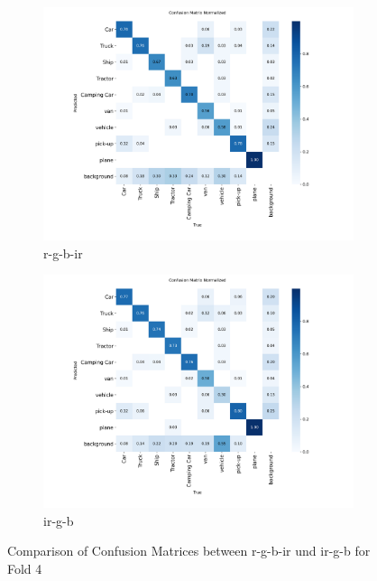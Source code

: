 \begin{figure}[h] 
    \centering
    \begin{subfigure}[b]{0.85\textwidth} %
        \includegraphics[width=\textwidth]{images/confusion_matrices/rgbir_F4_confusion_matrix_normalized.png} %
        \caption{r-g-b-ir} %
        \label{fig:cm_trgbir} %
    \end{subfigure}
    \hfill %
    \begin{subfigure}[b]{0.85\textwidth} %
        \includegraphics[width=\textwidth]{images/confusion_matrices/irgb_F4_confusion_matrix_normalized.png} %
        \caption{ir-g-b} %
        \label{fig:cm_irgb} %
    \end{subfigure}
    \caption{Comparison of Confusion Matrices between r-g-b-ir und ir-g-b for Fold 4} %
    \label{fig:combined_maps} %
\end{figure}

